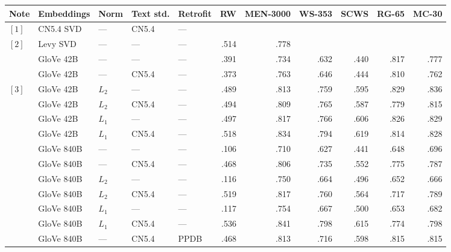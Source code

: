 \documentclass[letterpaper]{article}
\begin{document}
\begin{table*}[t]
\centering
\begin{tabular}{lllllrrrrrr}
\toprule
Note &Embeddings   & Norm  & Text std. & Retrofit &       RW & MEN-3000 &    WS-353 &      SCWS &    RG-65 &    MC-30 \\
\midrule
$[1]$&CN5.4 SVD    & ---   & CN5.4     & ---      &          &          &           &           &          &          \\
$[2]$&Levy SVD     & ---   & ---       & ---      &     .514 &     .778 &           &           &          &          \\
\midrule
     &GloVe 42B    & ---   & ---       & ---      &     .391 &     .734 &      .632 &      .440 &     .817 &     .777 \\
     &GloVe 42B    & ---   & CN5.4     & ---      &     .373 &     .763 &      .646 &      .444 &     .810 &     .762 \\
$[3]$&GloVe 42B    & $L_2$ & ---       & ---      &     .489 &     .813 &      .759 &      .595 &     .829 &     .836 \\
     &GloVe 42B    & $L_2$ & CN5.4     & ---      &     .494 &     .809 &      .765 &      .587 &     .779 &     .815 \\
     &GloVe 42B    & $L_1$ & ---       & ---      &     .497 &     .817 &      .766 &      .606 &     .826 &     .829 \\
     &GloVe 42B    & $L_1$ & CN5.4     & ---      &     .518 &     .834 &      .794 &      .619 &     .814 &     .828 \\
\midrule
     &GloVe 840B   & ---   & ---       & ---      &     .106 &     .710 &      .627 &      .441 &     .648 &     .696 \\
     &GloVe 840B   & ---   & CN5.4     & ---      &     .468 &     .806 &      .735 &      .552 &     .775 &     .787 \\
     &GloVe 840B   & $L_2$ & ---       & ---      &     .116 &     .750 &      .664 &      .496 &     .652 &     .666 \\
     &GloVe 840B   & $L_2$ & CN5.4     & ---      &     .519 &     .817 &      .760 &      .564 &     .717 &     .789 \\
     &GloVe 840B   & $L_1$ & ---       & ---      &     .117 &     .754 &      .667 &      .500 &     .653 &     .682 \\
     &GloVe 840B   & $L_1$ & CN5.4     & ---      &     .536 &     .841 &      .798 &      .615 &     .774 &     .798 \\
\midrule
     &GloVe 840B   & ---   & CN5.4     & PPDB     &     .468 &     .813 &      .716 &      .598 &     .815 &     .815 \\

\end{tabular}
\end{table*}
\end{document}
